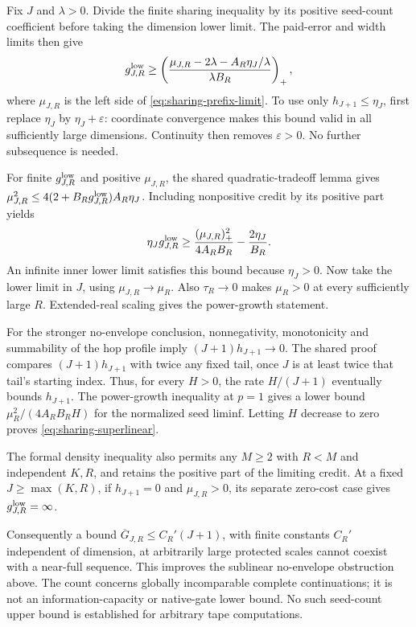 \begin{outline}
Fix $J$ and $\lambda>0$. Divide the finite sharing inequality by its
positive seed-count coefficient before taking the dimension lower limit.
The paid-error and width limits then give
\[
 g^{\rm low}_{J,R}\ge
 \left(\frac{\mu_{J,R}-2\lambda-A_R\eta_J/\lambda}
                  {\lambda B_R}\right)_+,
\]
where $\mu_{J,R}$ is the left side of
\cref{eq:sharing-prefix-limit}. To use only $h_{J+1}\le\eta_J$,
first replace $\eta_J$ by $\eta_J+\varepsilon$: coordinate convergence
makes this bound valid in all sufficiently large dimensions. Continuity
then removes $\varepsilon>0$. No further subsequence is needed.

For finite $g^{\rm low}_{J,R}$ and positive $\mu_{J,R}$, the shared
quadratic-tradeoff lemma gives
$\mu_{J,R}^2\le4(2+B_Rg^{\rm low}_{J,R})A_R\eta_J$.
Including nonpositive credit by its positive part yields
\[
 \eta_Jg^{\rm low}_{J,R}
 \ge\frac{(\mu_{J,R})_+^2}{4A_RB_R}-\frac{2\eta_J}{B_R}.
\]
An infinite inner lower limit satisfies this bound because $\eta_J>0$.
Now take the lower limit in $J$, using $\mu_{J,R}\to\mu_R$.
Also $\tau_R\to0$ makes $\mu_R>0$ at every sufficiently large $R$.
Extended-real scaling gives the power-growth statement.

For the stronger no-envelope conclusion, nonnegativity, monotonicity
and summability of the hop profile imply $(J+1)h_{J+1}\to0$.
The shared proof compares $(J+1)h_{J+1}$ with twice any fixed tail,
once $J$ is at least twice that tail's starting index.
Thus, for every $H>0$, the rate $H/(J+1)$ eventually bounds
$h_{J+1}$. The power-growth inequality at $p=1$ gives a lower bound
$\mu_R^2/(4A_RB_RH)$ for the normalized seed liminf. Letting $H$
decrease to zero proves \cref{eq:sharing-superlinear}.
\end{outline}

The formal density inequality also permits any $M\ge2$ with $R<M$
and independent $K,R$, and retains the positive part of the limiting
credit. At a fixed $J\ge\max(K,R)$, if $h_{J+1}=0$ and
$\mu_{J,R}>0$, its separate zero-cost case gives
$g^{\rm low}_{J,R}=\infty$.

Consequently a bound $\overline G_{J,R}\le C_R'(J+1)$, with finite
constants $C_R'$ independent of dimension, at arbitrarily large protected
scales cannot coexist with a near-full sequence. This improves the
sublinear no-envelope obstruction above.
The count concerns globally incomparable complete continuations;
it is not an information-capacity or native-gate lower bound.
No such seed-count upper bound is established for arbitrary tape computations.

